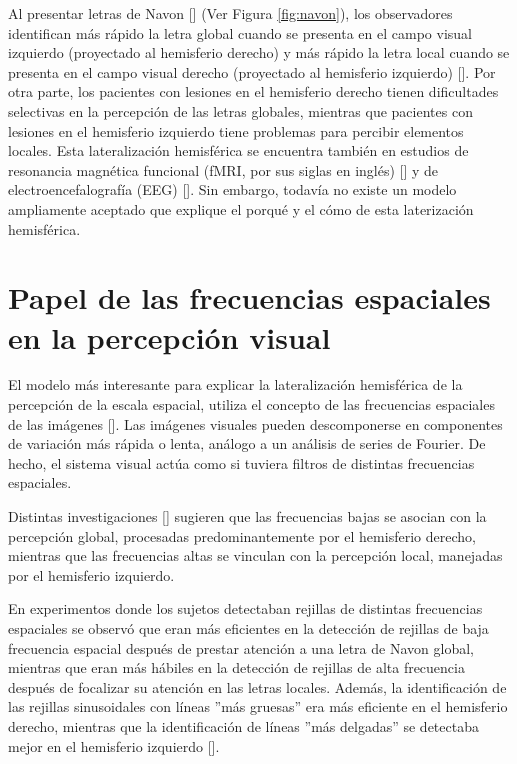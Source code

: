 Al presentar letras de Navon [\cite{navon_forest_1977}] (Ver Figura \ref{fig:navon}), los observadores identifican más rápido la letra global cuando se presenta en el campo visual izquierdo (proyectado al hemisferio derecho) y más rápido la letra local cuando se presenta en el campo visual derecho (proyectado al hemisferio izquierdo) [\cite{navon_forest_1977}]. Por otra parte, los pacientes con lesiones en el hemisferio derecho tienen dificultades selectivas en la percepción de las letras globales, mientras que pacientes con lesiones en el hemisferio izquierdo tiene problemas para percibir elementos locales. Esta lateralización hemisférica se encuentra también en estudios de resonancia magnética funcional (fMRI, por sus siglas en ingl\'es) [\cite{han_hemispheric_2002}] y de electroencefalograf\'ia (EEG) [\cite{iglesias-fuster_asynchronous_2015}]. Sin embargo, todavía no existe un modelo ampliamente aceptado que explique el porqué y el cómo de esta laterización hemisférica.

\section{Papel de las frecuencias espaciales en la percepción visual}

El modelo más interesante para explicar la lateralización hemisférica de la percepción de la escala espacial, utiliza el concepto de las frecuencias espaciales de las imágenes [\cite{robertson_hemispheric_2000}]. Las imágenes visuales pueden descomponerse en componentes de variación más rápida o lenta, análogo a un análisis de series de Fourier. De hecho, el sistema visual actúa como si tuviera filtros de distintas frecuencias espaciales.

Distintas investigaciones [\cite{flevaris_local_2010}] sugieren que las frecuencias bajas se asocian con la percepción global, procesadas predominantemente por el hemisferio derecho, mientras que las frecuencias altas se vinculan con la percepción local, manejadas por el hemisferio izquierdo.

En experimentos donde los sujetos detectaban rejillas de distintas frecuencias espaciales se observó que eran más eficientes en la detección de rejillas de baja frecuencia espacial después de prestar atención a una letra de Navon global, mientras que eran más hábiles en la detección de rejillas de alta frecuencia después de focalizar su atención en las letras locales. Además, la identificación de las rejillas sinusoidales con líneas  ”más gruesas” era más eficiente en el hemisferio derecho, mientras que la identificación de líneas ”más delgadas” se detectaba mejor en  el hemisferio izquierdo [\cite{flevaris_local_2010}]. 

